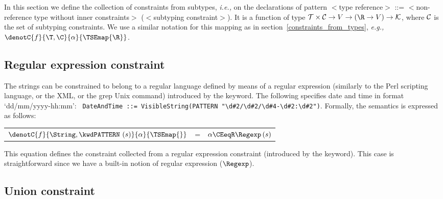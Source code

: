 
In this section we define the collection of constraints from
subtypes, \emph{i.e.,} on the declarations of pattern {\small $<$\textsf{type
reference}$>$  \textsf{::=} $<$\textsf{non-reference type without
inner constraints}$>$ \textsf{(}$<$\textsf{subtyping
constraint}$>$\textsf{)}}. It is a function of type ${\cal T} \times
{\cal C} \rightarrow V \rightarrow (\R \rightarrow V) \rightarrow
{\cal K}$, where ${\cal C}$ is the set of subtyping constraints. We
use a similar notation for this mapping as in
section~\ref{constraints_from_types},
\emph{e.g.,} $\denotC{f}{\T,\C}{\alpha}{\TSEmap{\R}}$.


\subsection{Regular expression constraint}

The strings can be constrained to belong to a regular language
defined by means of a regular expression (similarly to the Perl
scripting language, or the XML, or the \textsf{grep} Unix command)
introduced by the \kwdPATTERN{} keyword. The following specifies date
and time in format `{\sc dd/mm/yyyy-hh:mm}': \texttt{\small 
DateAndTime ::= VisibleString(PATTERN "}{\small \verb+\+}\texttt{\small d\#2/}{\small \verb+\+}\texttt{\small d\#2/}{\small \verb+\+}\texttt{\small d\#4-}{\small \verb+\+}\texttt{\small d\#2:}{\small \verb+\+}\texttt{\small d\#2")}. Formally, the semantics is expressed as follows:

\begin{center}
\begin{tabular}{rcl}
    $\denotC{f}{\String, \kwdPATTERN \,\, (s)}{\alpha}{\TSEmap{}}$
  & \hspace*{-4mm} = 
  & \hspace*{-4mm}
    $\alpha \CEeqR \Regexp \, (s)$
\end{tabular}
\end{center}

\noindent
This equation defines the constraint collected from a regular
expression constraint (introduced by the \kwdPATTERN{} keyword). This
case is straightforward since we have a built-in notion of
regular expression ($\Regexp$).

\subsection{Union constraint}\label{union_constraint}

